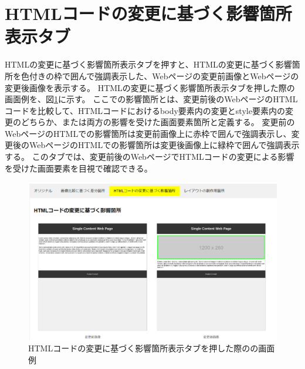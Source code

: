 \section{HTMLコードの変更に基づく影響箇所表示タブ}\label{subsec:html_tab}
HTMLの変更に基づく影響箇所表示タブを押すと、HTMLの変更に基づく影響箇所を色付きの枠で囲んで強調表示した、Webページの変更前画像とWebページの変更後画像を表示する。
HTMLの変更に基づく影響箇所表示タブを押した際の画面例を、図\ref{fig: Appearance_html_tab}に示す。
ここでの影響箇所とは、変更前後のWebページのHTMLコードを比較して、HTMLコードにおけるbody要素内の変更とstyle要素内の変更のどちらか、または両方の影響を受けた画面要素箇所と定義する。
変更前のWebページのHTMLでの影響箇所は変更前画像上に赤枠で囲んで強調表示し、変更後のWebページのHTMLでの影響箇所は変更後画像上に緑枠で囲んで強調表示する。
このタブでは、変更前後のWebページでHTMLコードの変更による影響を受けた画面要素を目視で確認できる。
\begin{figure}[tp]
    \begin{center}
        \includegraphics[width=1.0\columnwidth]{image/3_html_tab.png}
        \caption{HTMLコードの変更に基づく影響箇所表示タブを押した際の\toolName の画面例}
        \label{fig: Appearance_html_tab}
    \end{center}
\end{figure}



